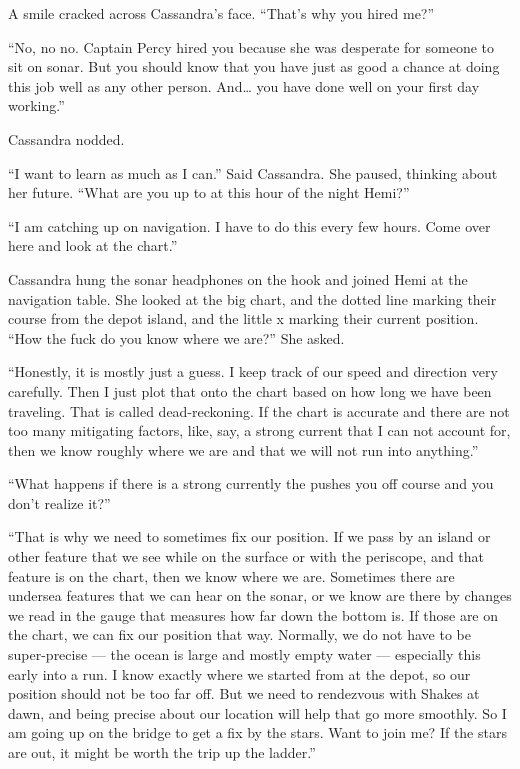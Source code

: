 \documentclass[]{scrbook}
\begin{document}
A smile cracked across Cassandra's face. ``That's why you hired me?''

``No, no no. Captain Percy hired you because she was desperate for
someone to sit on sonar. But you should know that you have just as good
a chance at doing this job well as any other person. And\ldots{} you
have done well on your first day working.''

Cassandra nodded.

``I want to learn as much as I can.'' Said Cassandra. She paused,
thinking about her future. ``What are you up to at this hour of the
night Hemi?''

``I am catching up on navigation. I have to do this every few hours.
Come over here and look at the chart.''

Cassandra hung the sonar headphones on the hook and joined Hemi at the
navigation table. She looked at the big chart, and the dotted line
marking their course from the depot island, and the little x marking
their current position. ``How the fuck do you know where we are?'' She
asked.

``Honestly, it is mostly just a guess. I keep track of our speed and
direction very carefully. Then I just plot that onto the chart based on
how long we have been traveling. That is called dead-reckoning. If the
chart is accurate and there are not too many mitigating factors, like,
say, a strong current that I can not account for, then we know roughly
where we are and that we will not run into anything.''

``What happens if there is a strong currently the pushes you off course
and you don't realize it?''

``That is why we need to sometimes fix our position. If we pass by an
island or other feature that we see while on the surface or with the
periscope, and that feature is on the chart, then we know where we are.
Sometimes there are undersea features that we can hear on the sonar, or
we know are there by changes we read in the gauge that measures how far
down the bottom is. If those are on the chart, we can fix our position
that way. Normally, we do not have to be super-precise --- the ocean is
large and mostly empty water --- especially this early into a run. I
know exactly where we started from at the depot, so our position should
not be too far off. But we need to rendezvous with Shakes at dawn, and
being precise about our location will help that go more smoothly. So I
am going up on the bridge to get a fix by the stars. Want to join me? If
the stars are out, it might be worth the trip up the ladder.''
\end{document}
